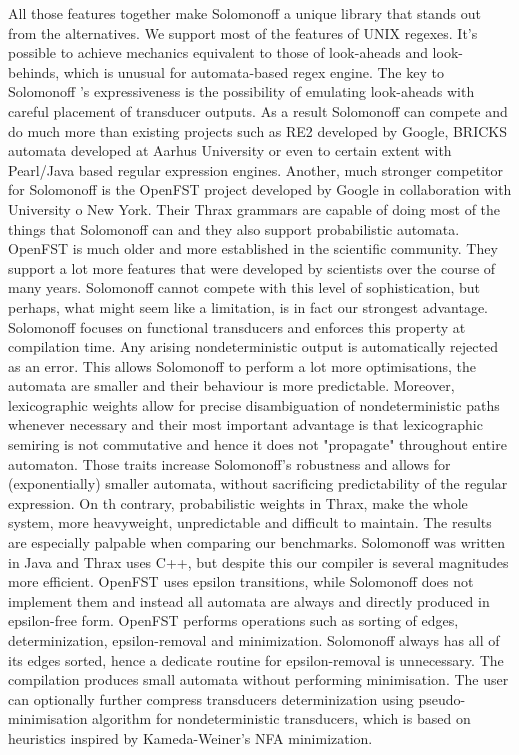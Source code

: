 All those features together make Solomonoff a unique library that stands out from the alternatives. We support most of the features of UNIX regexes. It's possible to achieve mechanics equivalent to those of look-aheads and look-behinds, which is unusual for automata-based regex engine. The key to Solomonoff 's expressiveness is the possibility of emulating look-aheads with careful placement of transducer outputs. As a result Solomonoff can compete and  do much more than existing projects such as RE2 developed by Google, BRICKS automata developed at Aarhus University or even to certain extent with Pearl/Java based regular expression engines. Another, much stronger competitor for Solomonoff is the OpenFST project developed by Google in collaboration with University o New York. Their Thrax grammars are capable of doing most of the things that Solomonoff can and they also support probabilistic automata. OpenFST is much older and more established in the scientific community. They support a lot more features that were developed by scientists over the course of many years. Solomonoff cannot compete with this level of sophistication, but perhaps, what might seem like a limitation, is in fact our strongest advantage. Solomonoff focuses on functional transducers and enforces this property at compilation time. Any arising nondeterministic output is automatically rejected as an error. This allows Solomonoff to perform a lot more optimisations, the automata are smaller and their behaviour is more predictable. Moreover, lexicographic weights allow for precise disambiguation of nondeterministic paths whenever necessary and their most important advantage is that lexicographic semiring is not commutative and hence it does not "propagate" throughout entire automaton. Those traits increase Solomonoff's robustness and allows for (exponentially) smaller automata, without sacrificing predictability of the regular expression. On th contrary, probabilistic weights in Thrax, make the whole system, more heavyweight, unpredictable and difficult to maintain. The results are especially palpable when comparing our benchmarks. Solomonoff was written in Java and Thrax uses C++, but despite this our compiler is several magnitudes more efficient. OpenFST uses epsilon transitions, while Solomonoff does not implement them and instead all automata are always and directly produced in epsilon-free form. OpenFST performs operations such as sorting of edges, determinization, epsilon-removal and minimization. Solomonoff always has all of its edges sorted, hence a dedicate routine for epsilon-removal is unnecessary. The compilation produces small automata without performing minimisation. The user can optionally further compress transducers determinization using pseudo-minimisation algorithm for nondeterministic transducers, which is based on heuristics inspired by Kameda-Weiner's NFA minimization. 

